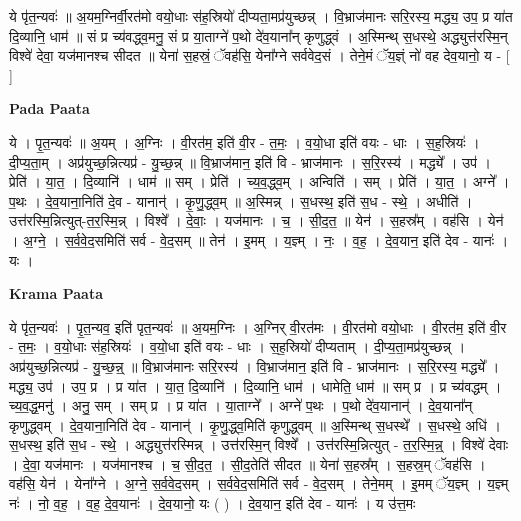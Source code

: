 \documentclass[17pt]{extarticle}
\begin{document}
ये पृ॑त॒न्यवः॑ ॥ अ॒यम॒ग्निर्वी॒रत॑मो वयो॒धाः स॑ह॒स्रियो॑ दीप्यता॒मप्र॑युच्छन्न् । वि॒भ्राज॑मानः सरि॒रस्य॒ मद्ध्य॒ उप॒ प्र या॑त दि॒व्यानि॒ धाम॑ ॥ सं प्र च्य॑वद्ध्व॒मनु॒ सं प्र या॒ताग्ने॑ प॒थो दे॑व॒याना᳚न् कृणुद्ध्वं । अ॒स्मिन्थ् स॒धस्थे॒ अद्ध्युत्त॑रस्मि॒न् विश्वे॑ देवा॒ यज॑मानश्च सीदत ॥ येना॑ स॒हस्रं॒ ॅवह॑सि॒ येना᳚ग्ने सर्ववेद॒सं । तेने॒मं ॅय॒ज्ञ्ं नो॑ वह देव॒यानो॒ य - [  ] \newline

\textbf{Pada Paata} \newline

ये । पृ॒त॒न्यवः॑ ॥ अ॒यम् । अ॒ग्निः । वी॒रत॑म॒ इति॑ वी॒र - त॒मः॒ । व॒यो॒धा इति॑ वयः - धाः । स॒ह॒स्रियः॑ । दी॒प्य॒ता॒म् । अप्र॑युच्छ॒न्नित्यप्र॑ - यु॒च्छ॒न्न् ॥ वि॒भ्राज॑मान॒ इति॑ वि - भ्राज॑मानः । स॒रि॒रस्य॑ । मद्ध्ये᳚ । उप॑ । प्रेति॑ । या॒त॒ । दि॒व्यानि॑ । धाम॑ ॥ सम् । प्रेति॑ । च्य॒व॒द्ध्व॒म् । अन्विति॑ । सम् । प्रेति॑ । या॒त॒ । अग्ने᳚ । प॒थः । दे॒व॒याना॒निति॑ दे॒व - यानान्॑ । कृ॒णु॒द्ध्व॒म् ॥ अ॒स्मिन्न् । स॒धस्थ॒ इति॑ स॒ध - स्थे॒ । अधीति॑ । उत्त॑रस्मि॒न्नित्युत्-त॒र॒स्मि॒न्न् । विश्वे᳚ । दे॒वाः॒ । यज॑मानः । च॒ । सी॒द॒त॒ ॥ येन॑ । स॒हस्र᳚म् । वह॑सि । येन॑ । अ॒ग्ने॒ । स॒र्व॒वे॒द॒समिति॑ सर्व - वे॒द॒सम् ॥ तेन॑ । इ॒मम् । य॒ज्ञ्म् । नः॒ । व॒ह॒ । दे॒व॒यान॒ इति॑ देव - यानः॑ । यः ।  \newline


\textbf{Krama Paata} \newline

ये पृ॑त॒न्यवः॑ । पृ॒त॒न्यव॒ इति॑ पृत॒न्यवः॑ ॥ अ॒यम॒ग्निः । अ॒ग्निर् वी॒रत॑मः । वी॒रत॑मो वयो॒धाः । वी॒रत॑म॒ इति॑ वी॒र - त॒मः॒ । व॒यो॒धाः स॑ह॒स्रियः॑ । व॒यो॒धा इति॑ वयः - धाः । स॒ह॒स्रियो॑ दीप्यताम् । दी॒प्य॒ता॒मप्र॑युच्छन्न् । अप्र॑युच्छ॒न्नित्यप्र॑ - यु॒च्छ॒न्न्॒ ॥ वि॒भ्राज॑मानः सरि॒रस्य॑ । वि॒भ्राज॑मान॒ इति॑ वि - भ्राज॑मानः । स॒रि॒रस्य॒ मद्ध्ये᳚ । मद्ध्य॒ उप॑ । उप॒ प्र । प्र या॑त । या॒त॒ दि॒व्यानि॑ । दि॒व्यानि॒ धाम॑ । धामेति॒ धाम॑ ॥ सम् प्र । प्र च्य॑वद्धम् । च्य॒व॒द्ध॒मनु॑ । अनु॒ सम् । सम् प्र । प्र या॑त । या॒ताग्ने᳚ । अग्ने॑ प॒थः । प॒थो दे॑व॒यानान्॑ । दे॒व॒याना᳚न् कृणुद्ध्वम् । दे॒व॒याना॒निति॑ देव - यानान्॑ । कृ॒णु॒द्ध्व॒मिति॑ कृणुद्ध्वम् ॥ अ॒स्मिन्थ् स॒धस्थे᳚ । स॒धस्थे॒ अधि॑ । स॒धस्थ॒ इति॑ स॒ध - स्थे॒ । अद्ध्युत्त॑रस्मिन्न् । उत्त॑रस्मि॒न् विश्वे᳚ । उत्त॑रस्मि॒न्नित्युत् - त॒र॒स्मि॒न्न्॒ । विश्वे॑ देवाः । दे॒वा॒ यज॑मानः । यज॑मानश्च । च॒ सी॒द॒त॒ । सी॒द॒तेति॑ सीदत ॥ येना॑ स॒हस्र᳚म् । स॒हस्र॒म् ॅवह॑सि । वह॑सि॒ येन॑ । येना᳚ग्ने । अ॒ग्ने॒ स॒र्व॒वे॒द॒सम् । स॒र्व॒वे॒द॒समिति॑ सर्व - वे॒द॒सम् । तेने॒मम् । इ॒मम् ॅय॒ज्ञ्म् । य॒ज्ञ्म् नः॑ । नो॒ व॒ह॒ । व॒ह॒ दे॒व॒यानः॑ । दे॒व॒यानो॒ यः ( ) । दे॒व॒यान॒ इति॑ देव - यानः॑ । य उ॑त्त॒मः \newline
\end{document}
